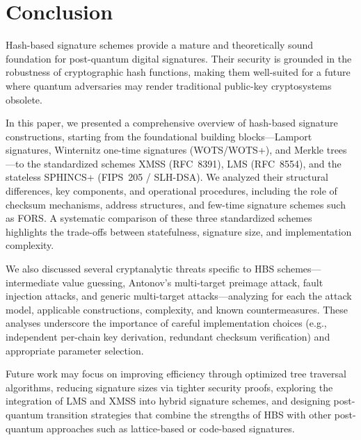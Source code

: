 \documentclass[version=preprint]{iacrcc}
\begin{document}
\section{Conclusion}

Hash-based signature schemes provide a mature and theoretically sound foundation for post-quantum digital signatures. Their security is grounded in the robustness of cryptographic hash functions, making them well-suited for a future where quantum adversaries may render traditional public-key cryptosystems obsolete. 

In this paper, we presented a comprehensive overview of hash-based signature constructions, starting from the foundational building blocks---Lamport signatures, Winternitz one-time signatures (WOTS/WOTS+), and Merkle trees---to the standardized schemes XMSS (RFC~8391), LMS (RFC~8554), and the stateless SPHINCS+ (FIPS~205 / SLH-DSA). We analyzed their structural differences, key components, and operational procedures, including the role of checksum mechanisms, address structures, and few-time signature schemes such as FORS. A systematic comparison of these three standardized schemes highlights the trade-offs between statefulness, signature size, and implementation complexity.

We also discussed several cryptanalytic threats specific to HBS schemes---intermediate value guessing, Antonov's multi-target preimage attack, fault injection attacks, and generic multi-target attacks---analyzing for each the attack model, applicable constructions, complexity, and known countermeasures. These analyses underscore the importance of careful implementation choices (e.g., independent per-chain key derivation, redundant checksum verification) and appropriate parameter selection.

Future work may focus on improving efficiency through optimized tree traversal algorithms, reducing signature sizes via tighter security proofs, exploring the integration of LMS and XMSS into hybrid signature schemes, and designing post-quantum transition strategies that combine the strengths of HBS with other post-quantum approaches such as lattice-based or code-based signatures.



\end{document}
